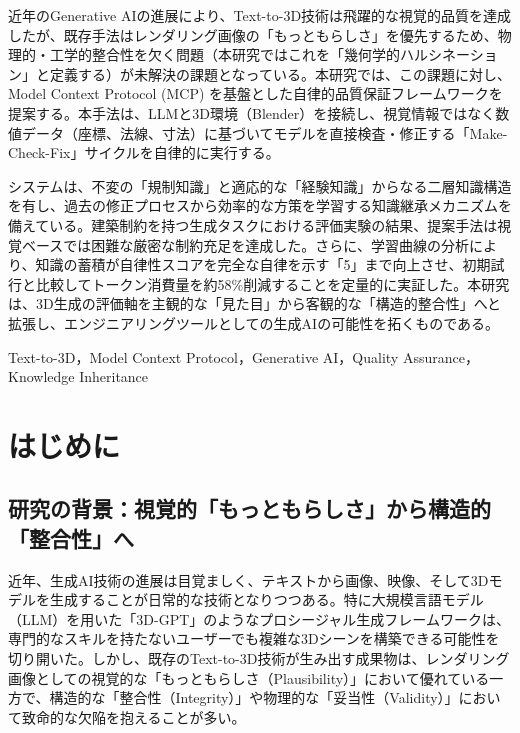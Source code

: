 \documentclass[dvipdfmx, a4paper, 9pt]{deimj}
\begin{document}
\pagestyle{empty}

\begin{jabstract}
近年のGenerative AIの進展により、Text-to-3D技術は飛躍的な視覚的品質を達成したが、既存手法はレンダリング画像の「もっともらしさ」を優先するため、物理的・工学的整合性を欠く問題（本研究ではこれを「幾何学的ハルシネーション」と定義する）が未解決の課題となっている。本研究では、この課題に対し、Model Context Protocol (MCP) を基盤とした自律的品質保証フレームワークを提案する。本手法は、LLMと3D環境（Blender）を接続し、視覚情報ではなく数値データ（座標、法線、寸法）に基づいてモデルを直接検査・修正する「Make-Check-Fix」サイクルを自律的に実行する。

システムは、不変の「規制知識」と適応的な「経験知識」からなる二層知識構造を有し、過去の修正プロセスから効率的な方策を学習する知識継承メカニズムを備えている。建築制約を持つ生成タスクにおける評価実験の結果、提案手法は視覚ベースでは困難な厳密な制約充足を達成した。さらに、学習曲線の分析により、知識の蓄積が自律性スコアを完全な自律を示す「5」まで向上させ、初期試行と比較してトークン消費量を約58\%削減することを定量的に実証した。本研究は、3D生成の評価軸を主観的な「見た目」から客観的な「構造的整合性」へと拡張し、エンジニアリングツールとしての生成AIの可能性を拓くものである。
\end{jabstract}

\begin{jkeyword}
Text-to-3D，Model Context Protocol，Generative AI，Quality Assurance，Knowledge Inheritance
\end{jkeyword}

\maketitle

\section{はじめに}

\subsection{研究の背景：視覚的「もっともらしさ」から構造的「整合性」へ}

近年、生成AI技術の進展は目覚ましく、テキストから画像、映像、そして3Dモデルを生成することが日常的な技術となりつつある。特に大規模言語モデル（LLM）を用いた「3D-GPT」\cite{sun20233dgpt}のようなプロシージャル生成フレームワークは、専門的なスキルを持たないユーザーでも複雑な3Dシーンを構築できる可能性を切り開いた。しかし、既存のText-to-3D技術が生み出す成果物は、レンダリング画像としての視覚的な「もっともらしさ（Plausibility）」において優れている一方で、構造的な「整合性（Integrity）」や物理的な「妥当性（Validity）」において致命的な欠陥を抱えることが多い。
\end{document}

